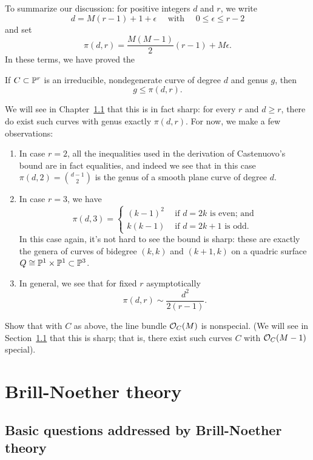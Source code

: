To summarize our discussion: for positive integers $d$ and $r$, we write
$$
 d = M(r-1) + 1 + \epsilon \quad \text{ with } \quad 0 \leq \epsilon \leq r-2
$$
and set
$$
\pi(d,r) = \frac{M(M-1)}{2}(r-1) + M\epsilon.
$$
In these terms, we have proved the

\begin{theorem}
If $C \subset {\mathbb P}^r$ is an irreducible, nondegenerate curve of degree $d$ and genus $g$, then
$$
g \leq \pi(d,r).
$$
\end{theorem}

We will see in Chapter~\ref{} that this is in fact sharp: for every $r$ and $d \geq r$, there do exist such curves with genus exactly $\pi(d,r)$. For now, we make a few observations:

\begin{enumerate}
\item In case $r=2$, all the inequalities used in the derivation of Castenuovo's bound are in fact equalities, and indeed we see that in this case $\pi(d,2) = \binom{d-1}{2}$ is the genus of a smooth plane curve of degree $d$.

\item In case $r=3$, we have
$$
\pi(d,3) =
\begin{cases}
\left( k - 1 \right)^2 &\text{ if $d=2k$ is even; and} \\
k(k-1) &\text{ if $d=2k+1$ is odd.}
\end{cases}
$$
In this case again, it's not hard to see the bound is sharp: these are exactly the genera of curves of bidegree $(k,k)$ and $(k+1,k)$ on a quadric surface $Q \cong {\mathbb P}^1 \times {\mathbb P}^1 \subset {\mathbb P}^3$.
\item In general, we see that for fixed $r$ asymptotically
$$
\pi(d,r) \sim \frac{d^2}{2(r-1)}.
$$
\end{enumerate}


\begin{exercise}
Show that with $C$ as above, the line bundle ${\mathcal O}_C(M)$ is nonspecial. (We will see in Section~\ref{} that this is sharp; that is, there exist such curves $C$ with ${\mathcal O}_C(M-1)$ special).
\end{exercise}

\section{Brill-Noether theory}
\subsection{Basic questions addressed by Brill-Noether theory}

